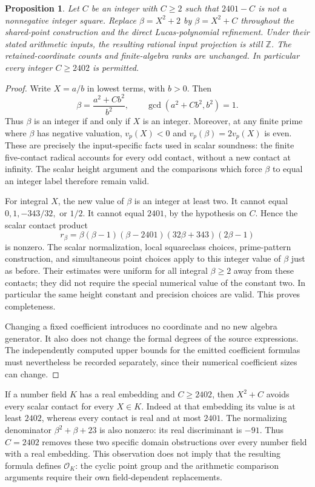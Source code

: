 \documentclass[11pt]{article}
\newtheorem{proposition}[theorem]{Proposition}
\theoremstyle{definition}
\begin{document}
\begin{proposition}\label{p3:integer-shift}
Let $C$ be an integer with $C\ge2$ such that $2401-C$ is not a
nonnegative integer square. Replace $\beta=X^2+2$ by
$\beta=X^2+C$ throughout the shared-point construction and the direct
Lucas-polynomial refinement. Under their stated arithmetic inputs,
the resulting rational input projection is still $\mathbb Z$.
The retained-coordinate counts and finite-algebra ranks are unchanged.
In particular every integer $C\ge2402$ is permitted.
\end{proposition}
\begin{proof}
Write $X=a/b$ in lowest terms, with $b>0$. Then
\[
                \beta=\frac{a^2+Cb^2}{b^2},
          \qquad \gcd(a^2+Cb^2,b^2)=1.
\]
Thus $\beta$ is an integer if and only if $X$ is an integer.
Moreover, at any finite prime where $\beta$ has negative valuation,
$v_p(X)<0$ and $v_p(\beta)=2v_p(X)$ is even. These are precisely
the input-specific facts used in scalar soundness: the finite
five-contact radical accounts for every odd contact, without a new
contact at infinity. The scalar height argument and the comparisons
which force $\beta$ to equal an integer label therefore remain valid.

For integral $X$, the new value of $\beta$ is an integer at least
two. It cannot equal $0,1,-343/32,$ or $1/2$. It cannot equal
$2401$, by the hypothesis on $C$. Hence the scalar contact product
\[
 r_\beta=\beta(\beta-1)(\beta-2401)(32\beta+343)(2\beta-1)
\]
is nonzero. The scalar normalization, local squareclass choices,
prime-pattern construction, and simultaneous point choices apply
to this integer value of $\beta$ just as before. Their estimates
were uniform for all integral $\beta\ge2$ away from these contacts;
they did not require the special numerical value of the constant
two. In particular the same height constant and precision choices
are valid. This proves completeness.

Changing a fixed coefficient introduces no coordinate and no new
algebra generator. It also does not change the formal degrees of the
source expressions. The independently computed upper bounds for the
emitted coefficient formulas must nevertheless be recorded separately,
since their numerical coefficient sizes can change.
\end{proof}

If a number field $K$ has a real embedding and $C\ge2402$, then
$X^2+C$ avoids every scalar contact for every $X\in K$. Indeed at
that embedding its value is at least $2402$, whereas every contact
is real and at most $2401$. The normalizing denominator
$\beta^2+\beta+23$ is also nonzero: its real discriminant is
$-91$. Thus $C=2402$ removes these two specific domain obstructions
over every number field with a real embedding. This observation
does not imply that the resulting formula defines $\mathcal O_K$:
the cyclic point group and the arithmetic comparison arguments
require their own field-dependent replacements.
\end{document}
